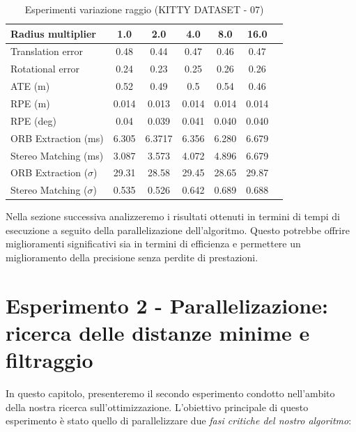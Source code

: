 \documentclass[12pt,a4paper]{report}
\begin{document}
\newpage
\begin{table}[h]
    \centering
    \caption{Esperimenti variazione raggio (KITTY DATASET - 07) }
    \begin{tabular}{lcccccc}
        \toprule
        \rowcolor{gray!20}
        Radius multiplier & 1.0 & \cellcolor{orange!40}2.0 & 4.0 & 8.0 & 16.0 \\
        \midrule
        Translation error & 0.48 & \cellcolor{green!20}0.44 & 0.47 & 0.46 & 0.47 \\
        Rotational error  & 0.24 & \cellcolor{green!20}0.23 & 0.25 & 0.26 & 0.26 \\
        ATE (m)           & 0.52 & 0.49 & 0.5 & 0.54 & \cellcolor{green!20}0.46 \\
        RPE (m)           & 0.014 & \cellcolor{green!20}0.013 & 0.014 & 0.014 & 0.014 \\
        RPE (deg)         & 0.04 & \cellcolor{green!20}0.039 & 0.041 & 0.040 & 0.040 \\
        ORB Extraction (ms) & 6.305 & 6.3717 & 6.356 & \cellcolor{green!20}6.280 & 6.679 \\
        Stereo Matching (ms) & \cellcolor{green!20}3.087 & 3.573 & 4.072 & 4.896 & 6.679 \\
        ORB Extraction ($\sigma$) & 29.31 & \cellcolor{green!20}28.58 & 29.45 & 28.65 & 29.87 \\
        Stereo Matching ($\sigma$) & 0.535 & \cellcolor{green!20}0.526 & 0.642 & 0.689 & 0.688 \\
        \bottomrule
    \end{tabular}
\end{table}

Nella sezione successiva analizzeremo i risultati ottenuti in termini di tempi di esecuzione a seguito della parallelizazione  dell'algoritmo. Questo potrebbe offrire miglioramenti significativi sia in termini di efficienza e permettere un miglioramento della precisione senza perdite di prestazioni.


\newpage
\section{Esperimento 2 - Parallelizazione: ricerca delle distanze minime e filtraggio}

In questo capitolo, presenteremo il secondo esperimento condotto nell'ambito della nostra ricerca sull'ottimizzazione. L'obiettivo principale di questo esperimento è stato quello di parallelizzare due \textit{fasi critiche del nostro algoritmo}:
\end{document}
